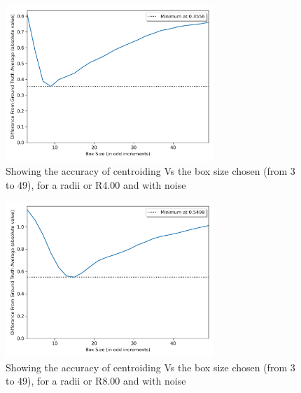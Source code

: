 \documentclass[aps,pra,a4paper,nofootinbib,onecolumn,tightenlines,longbibliography,12pt,amsfonts,amssymb,amsmath,floatfix]{revtex4-2} %
\begin{document}
 \begin{figure}[H]
   \begin{center}
     \includegraphics[width=0.7\textwidth]{project_pics/box_size_var_noise_r4.png}
   \end{center}
   \caption{Showing the accuracy of centroiding Vs the box size chosen (from 3 to 49), for a radii or R4.00 and with noise}
   \label{fig:box_size_var_noise_r4}
 \end{figure}

 \begin{figure}[H]
   \begin{center}
     \includegraphics[width=0.7\textwidth]{project_pics/box_size_var_noise_r8.png}
   \end{center}
   \caption{Showing the accuracy of centroiding Vs the box size chosen (from 3 to 49), for a radii or R8.00 and with noise}
   \label{fig:box_size_var_noise_r8}
 \end{figure}
\end{document}
